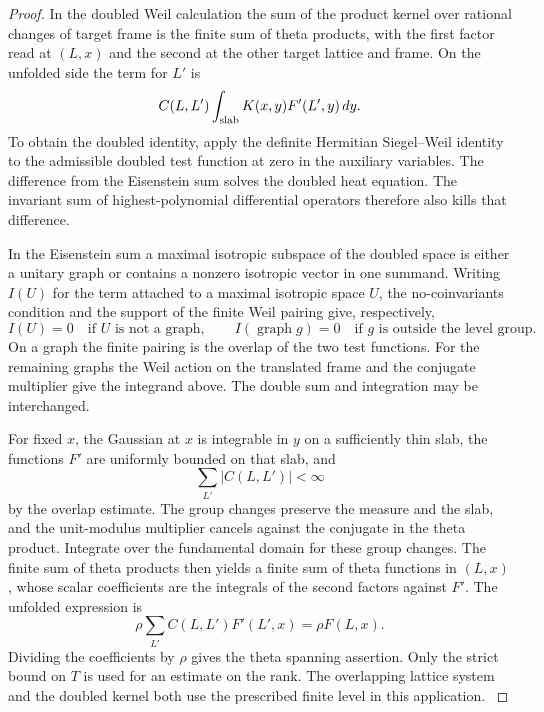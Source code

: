 \begin{proof}
In the doubled Weil calculation the sum of the product
kernel over rational changes of target frame is
the finite sum of theta products, with the first
factor read at \((L,x)\) and the second at the other
target lattice and frame. On the unfolded side
the term for \(L'\) is
\[
    C(L,L')\int_{\rm slab} K(x,y)F'(L',y)\,dy .
\]
To obtain the doubled identity, apply the definite
Hermitian Siegel--Weil identity to the admissible
doubled test function at zero in the auxiliary
variables. The difference from the Eisenstein sum
solves the doubled heat equation. The invariant
sum of highest-polynomial differential operators
therefore also kills that difference.

In the
Eisenstein sum a maximal isotropic subspace of
the doubled space is either a unitary graph or
contains a nonzero isotropic vector in one summand.
Writing \(I(U)\) for the term attached to a maximal isotropic space \(U\), the no-coinvariants condition and the support of the finite Weil pairing give, respectively,
\[
 I(U)=0\quad\text{if }U\text{ is not a graph},
 \qquad I(\operatorname{graph}g)=0\quad\text{if }g\text{ is outside the level group}.
\]
On a graph the finite pairing is the overlap of the two test functions. For the
remaining graphs the Weil action on the translated
frame and the conjugate multiplier give the
integrand above. The double sum and
integration may be interchanged.

For fixed \(x\),
the Gaussian at \(x\) is integrable in \(y\) on a
sufficiently thin slab, the functions \(F'\) are
uniformly bounded on that slab, and
\[
 \sum_{L'}|C(L,L')|<\infty
\]
by the overlap
estimate. The group changes preserve the measure
and the slab, and the unit-modulus multiplier
cancels against the conjugate in the theta product.
Integrate over the fundamental domain for these
group changes. The finite sum of theta products
then yields a finite sum of theta functions in
\((L,x)\), whose scalar coefficients are the integrals
of the second factors against \(F'\).
The unfolded expression is
\[
    \rho\sum_{L'} C(L,L')F'(L',x)=\rho F(L,x).
\]
Dividing the coefficients by \(\rho\) gives the
theta spanning assertion. Only the strict bound
on \(T\) is used for an estimate on the rank.
The overlapping lattice system and the doubled
kernel both use the prescribed finite level in this
application. \label{cor:theta-row-rank-1}


\end{proof}
